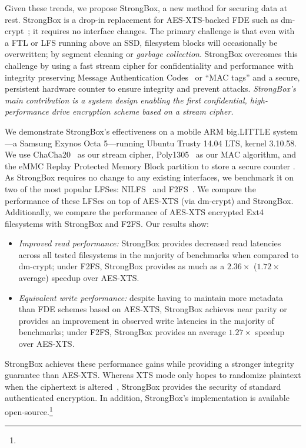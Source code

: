 Given these trends, we propose StrongBox, a new method for securing data at
rest. StrongBox is a drop-in replacement for AES-XTS-backed FDE such as
dm-crypt~\cite{dmcrypt}; \ie it requires no interface changes. The primary
challenge is that even with a FTL or LFS running above an SSD, filesystem blocks
will occasionally be overwritten; \eg by segment cleaning or \emph{garbage
collection}. StrongBox overcomes this challenge by using a fast stream cipher
for confidentiality and performance with integrity preserving Message
Authentication Codes~\cite{MAC} or ``MAC tags'' and a secure, persistent
hardware counter to ensure integrity and prevent attacks. \emph{StrongBox's main
contribution is a system design enabling the first confidential, high-
performance drive encryption scheme based on a stream cipher.}

We demonstrate StrongBox's effectiveness on a mobile ARM big.LITTLE system---a
Samsung Exynos Octa 5---running Ubuntu Trusty 14.04 LTS, kernel 3.10.58. We use
ChaCha20~\cite{ChaCha20} as our stream cipher, Poly1305~\cite{Poly1305} as our
MAC algorithm, and the eMMC Replay Protected Memory Block partition to store a
secure counter \cite{eMMC-standard}. As StrongBox requires no change to any
existing interfaces, we benchmark it on two of the most popular LFSes:
NILFS~\cite{NILFS} and F2FS~\cite{F2FS}. We compare the performance of these
LFSes on top of AES-XTS (via dm-crypt) and StrongBox. Additionally, we compare
the performance of AES-XTS encrypted Ext4 filesystems with StrongBox and F2FS.
Our results show:

\begin{itemize}

  \item \emph{Improved read performance:} StrongBox provides decreased read
latencies across all tested filesystems in the majority of benchmarks when
compared to dm-crypt; \eg under F2FS, StrongBox provides as much as a
$2.36\times$ ($1.72\times$ average) speedup over AES-XTS\@.

  \item \emph{Equivalent write performance:} despite having to maintain more
metadata than FDE schemes based on AES-XTS, StrongBox achieves near parity or
provides an improvement in observed write latencies in the majority of
benchmarks; \eg under F2FS, StrongBox provides an average $1.27\times$ speedup
over AES-XTS\@.

\end{itemize}

StrongBox achieves these performance gains while providing a stronger integrity
guarantee than AES-XTS\@. Whereas XTS mode only hopes to randomize plaintext when
the ciphertext is altered~\cite{XTS}, StrongBox provides the security of
standard authenticated encryption. In addition, StrongBox's implementation is
available open-source.\footnote{\StrongBoxURI}

